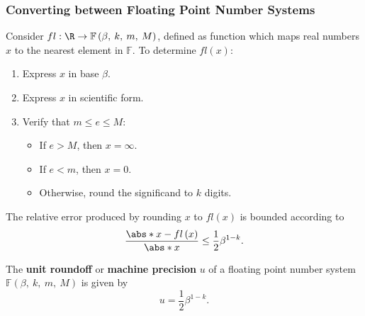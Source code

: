 \documentclass{article}
\begin{document}
\subsubsection{Converting between Floating Point Number Systems}
Consider \(fl : \R \to \mathbb{F}\left( \beta,\: k,\: m,\: M \right)\),
defined as function which maps real numbers \(x\) to the nearest
element in \(\mathbb{F}\). To determine \(fl\left( x \right)\):
\begin{enumerate}
    \item Express \(x\) in base \(\beta\).
    \item Express \(x\) in scientific form.
    \item Verify that \(m \leq e \leq M\):
          \begin{itemize}
              \item If \(e > M\), then \(x = \infty\).
              \item If \(e < m\), then \(x = 0\).
              \item Otherwise, round the significand to \(k\) digits.
          \end{itemize}
\end{enumerate}
The relative error produced by rounding \(x\) to \(fl\left( x \right)\)
is bounded according to
\begin{equation*}
    \frac{\abs*{x - fl\left( x \right)}}{\abs*{x}} \leq \frac{1}{2} \beta^{1 - k}.
\end{equation*}
\begin{definition}
    The \textbf{unit roundoff} or \textbf{machine precision} \(u\) of a
    floating point number system
    \(\mathbb{F}\left( \beta,\: k,\: m,\: M \right)\) is given by
    \begin{equation*}
        u = \frac{1}{2} \beta^{1 - k}.
    \end{equation*}
\end{definition}
\end{document}
